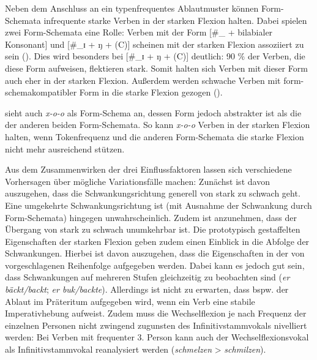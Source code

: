 Neben dem Anschluss an ein typenfrequentes Ablautmuster können Form-Schemata infrequente starke Verben in der starken Flexion halten. Dabei spielen zwei Form-Schemata eine Rolle: Verben mit der Form [\#\_{} + bilabialer Konsonant] und [\#\_ɪ + ŋ + (C)] scheinen mit der starken Flexion assoziiert zu sein (\cite{Kopcke.1999}). Dies wird besonders bei [\#\_ɪ + ŋ + (C)] deutlich: 90 \% der Verben, die diese Form aufweisen, flektieren stark. Somit halten sich Verben mit dieser Form auch eher in der starken Flexion. Außerdem werden schwache Verben mit form-schemakompatibler Form in die starke Flexion gezogen (\cite[56]{Kopcke.1999}).


 \textcite[166--170]{Nowak.2018} sieht auch \textit{x-o-o} als Form-Schema an, dessen Form jedoch abstrakter ist als die der anderen beiden Form-Schemata. So kann \textit{x-o-o} Verben in der starken Flexion halten, wenn Tokenfrequenz und die anderen Form-Schemata die starke Flexion nicht mehr ausreichend stützen. 

Aus dem Zusammenwirken der drei Einflussfaktoren lassen sich verschiedene Vorhersagen über mögliche Variationsfälle machen: Zunächst ist davon auszugehen, dass die Schwankungsrichtung generell von stark zu schwach geht. Eine umgekehrte Schwankungsrichtung ist (mit Ausnahme der Schwankung durch Form-Schemata) hingegen unwahrscheinlich. Zudem ist anzunehmen, dass der Übergang von stark zu schwach unumkehrbar ist. Die prototypisch gestaffelten Eigenschaften der starken Flexion geben zudem einen Einblick in die Abfolge der Schwankungen. Hierbei ist davon auszugehen, dass die Eigenschaften in der von \textcite{Bittner.1996} vorgeschlagenen Reihenfolge aufgegeben werden. Dabei kann es jedoch gut sein, dass Schwankungen auf mehreren Stufen gleichzeitig zu beobachten sind (\textit{er bäckt/backt}; \textit{er buk/backte}). Allerdings ist nicht zu erwarten, dass bspw. der Ablaut im Präteritum aufgegeben wird, wenn ein Verb eine stabile Imperativhebung aufweist. Zudem muss die Wechselflexion je nach Frequenz der einzelnen Personen  nicht zwingend zugunsten des Infinitivstammvokals nivelliert werden: Bei Verben mit frequenter 3. Person kann auch der Wechselflexionsvokal als Infinitivstammvokal reanalysiert werden (\textit{schmelzen} > \textit{schmilzen}). 

